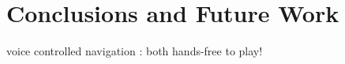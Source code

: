 \section{Conclusions and Future Work}


voice controlled navigation \cite{StowellPlumbley-smc2010-timbre-remapping-regression-tree,Fasciano-si2013b}: both hands-free to play!

